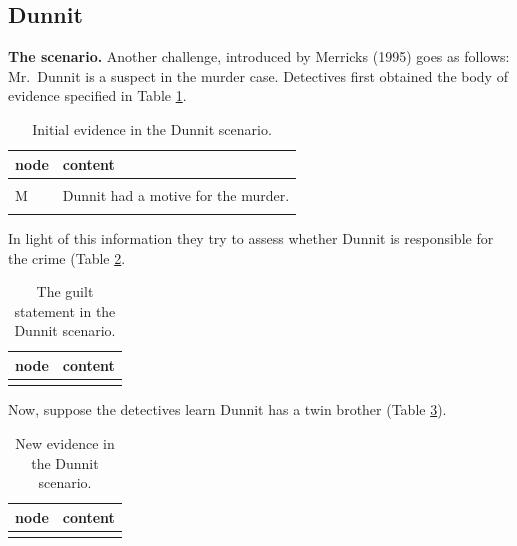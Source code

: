\documentclass[
  10pt,
]{scrartcl}
\begin{document}
\hypertarget{dunnit}{%
\subsection{Dunnit}\label{dunnit}}

\textbf{The scenario.} Another challenge, introduced by Merricks (1995) goes as follows: Mr.~Dunnit is a suspect in the murder case. Detectives first obtained the body of evidence specified in Table \ref{tab:dunnitPropositions1}.

\begin{table}[H]

\caption{\label{tab:dunnitPropositions1}Initial evidence in the Dunnit scenario.}
\centering
\begin{tabular}[t]{l>{\raggedright\arraybackslash}p{25em}}
\toprule
node & content\\
\midrule
\cellcolor{gray!6}{I} & \cellcolor{gray!6}{Witnesses claim to have seen Dunnit do it (incriminating testimony).}\\
M & Dunnit had a motive for the murder.\\
\cellcolor{gray!6}{W} & \cellcolor{gray!6}{A credible witness claims to have seen Dunnit two hundred miles from the scene of the crime at the time of the murder.}\\
\bottomrule
\end{tabular}
\end{table}

\noindent In light of this information they try to assess whether Dunnit is responsible for the crime (Table \ref{tab:dunnitPropositions2}.

\begin{table}[H]

\caption{\label{tab:dunnitPropositions2}The guilt statement in the Dunnit scenario.}
\centering
\begin{tabular}[t]{l>{\raggedright\arraybackslash}p{25em}}
\toprule
node & content\\
\midrule
\cellcolor{gray!6}{G} & \cellcolor{gray!6}{Dunnit is guilty.}\\
\bottomrule
\end{tabular}
\end{table}

\noindent Now, suppose the detectives learn Dunnit has a twin brother (Table \ref{tab:dunnitPropositions3}).

\begin{table}[H]

\caption{\label{tab:dunnitPropositions3}New evidence in the Dunnit scenario.}
\centering
\begin{tabular}[t]{l>{\raggedright\arraybackslash}p{25em}}
\toprule
node & content\\
\midrule
\cellcolor{gray!6}{Tw} & \cellcolor{gray!6}{Dunnit has an identical twin which was seen by the credible witness two hundred miles from the scene of the crime during the murder.}\\
\bottomrule
\end{tabular}
\end{table}
\end{document}
